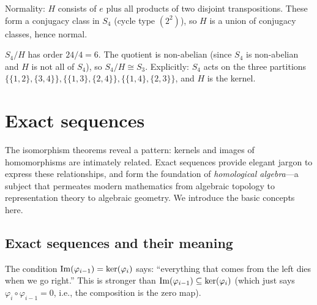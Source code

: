 \documentclass{report}
\begin{document}
\begin{solution}
Normality: \(H\) consists of \(e\) plus all products of two disjoint transpositions. These form a conjugacy class in \(S_4\) (cycle type \((2^2)\)), so \(H\) is a union of conjugacy classes, hence normal.

\(S_4/H\) has order \(24/4 = 6\). The quotient is non-abelian (since \(S_4\) is non-abelian and \(H\) is not all of \(S_4\)), so \(S_4/H \cong S_3\). Explicitly: \(S_4\) acts on the three partitions \(\{\{1,2\},\{3,4\}\}, \{\{1,3\},\{2,4\}\}, \{\{1,4\},\{2,3\}\}\), and \(H\) is the kernel.
\end{solution}

\section{Exact sequences}

The isomorphism theorems reveal a pattern: kernels and images of homomorphisms are intimately related. Exact sequences provide elegant jargon to express these relationships, and form the foundation of \emph{homological algebra}---a subject that permeates modern mathematics from algebraic topology to representation theory to algebraic geometry. We introduce the basic concepts here.

\subsection{Exact sequences and their meaning}


The condition \(\operatorname{Im}(\varphi_{i-1}) = \ker(\varphi_i)\) says: ``everything that comes from the left dies when we go right.'' This is stronger than \(\operatorname{Im}(\varphi_{i-1}) \subseteq \ker(\varphi_i)\) (which just says \(\varphi_i \circ \varphi_{i-1} = 0\), i.e., the composition is the zero map).

\end{document}
